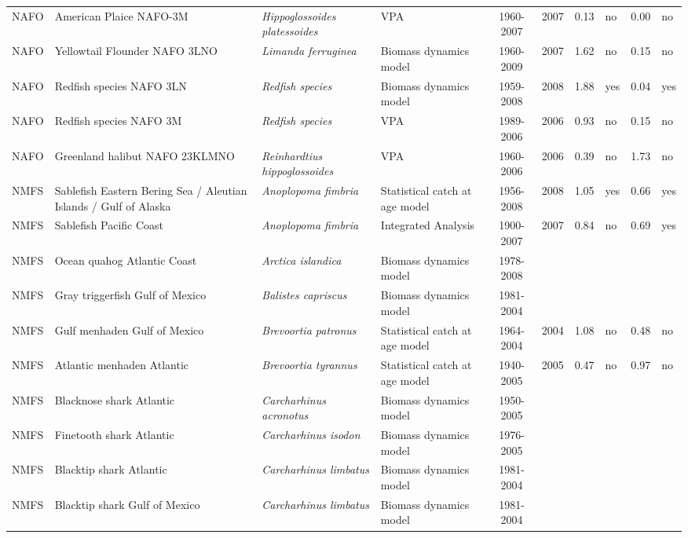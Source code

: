 \begin{longtable}{p{1.8cm}p{3.5cm}p{3.5cm}p{3cm}cccp{0.9cm}cp{0.9cm}}
  NAFO & American Plaice NAFO-3M & \textit{Hippoglossoides platessoides} & VPA & 1960-2007 & 2007 & 0.13 & no & 0.00 & no \\ 
  NAFO & Yellowtail Flounder NAFO 3LNO & \textit{Limanda ferruginea} & Biomass dynamics model & 1960-2009 & 2007 & 1.62 & no & 0.15 & no \\ 
  NAFO & Redfish species NAFO 3LN & \textit{Redfish species} & Biomass dynamics model & 1959-2008 & 2008 & 1.88 & yes & 0.04 & yes \\ 
  NAFO & Redfish species NAFO 3M & \textit{Redfish species} & VPA & 1989-2006 & 2006 & 0.93 & no & 0.15 & no \\ 
  NAFO & Greenland halibut NAFO 23KLMNO & \textit{Reinhardtius hippoglossoides} & VPA & 1960-2006 & 2006 & 0.39 & no & 1.73 & no \\ 
  NMFS & Sablefish Eastern Bering Sea / Aleutian Islands / Gulf of Alaska & \textit{Anoplopoma fimbria} & Statistical catch at age model & 1956-2008 & 2008 & 1.05 & yes & 0.66 & yes \\ 
  NMFS & Sablefish Pacific Coast & \textit{Anoplopoma fimbria} & Integrated Analysis & 1900-2007 & 2007 & 0.84 & no & 0.69 & yes \\ 
  NMFS & Ocean quahog Atlantic Coast & \textit{Arctica islandica} & Biomass dynamics model & 1978-2008 &  &  &  &  &  \\ 
  NMFS & Gray triggerfish Gulf of Mexico & \textit{Balistes capriscus} & Biomass dynamics model & 1981-2004 &  &  &  &  &  \\ 
  NMFS & Gulf menhaden Gulf of Mexico & \textit{Brevoortia patronus} & Statistical catch at age model & 1964-2004 & 2004 & 1.08 & no & 0.48 & no \\ 
  NMFS & Atlantic menhaden Atlantic & \textit{Brevoortia tyrannus} & Statistical catch at age model & 1940-2005 & 2005 & 0.47 & no & 0.97 & no \\ 
  NMFS & Blacknose shark Atlantic & \textit{Carcharhinus acronotus} & Biomass dynamics model & 1950-2005 &  &  &  &  &  \\ 
  NMFS & Finetooth shark Atlantic & \textit{Carcharhinus isodon} & Biomass dynamics model & 1976-2005 &  &  &  &  &  \\ 
  NMFS & Blacktip shark Atlantic & \textit{Carcharhinus limbatus} & Biomass dynamics model & 1981-2004 &  &  &  &  &  \\ 
  NMFS & Blacktip shark Gulf of Mexico & \textit{Carcharhinus limbatus} & Biomass dynamics model & 1981-2004 &  &  &  &  &  \\ 

\end{longtable}
